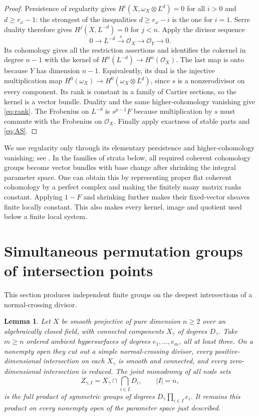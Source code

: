 \documentclass[11pt]{article}
\newtheorem{lemma}[theorem]{Lemma}
\theoremstyle{remark}\newtheorem{remark}[theorem]{Remark}
\newcommand{\OO}{\mathcal O}
\begin{document}
\begin{proof}
Persistence of regularity gives $H^i(X,\omega_X\otimes L^d)=0$ for all $i>0$ and $d\ge r_\omega-1$: the strongest of the inequalities $d\ge r_\omega-i$ is the one for $i=1$. Serre duality therefore gives $H^j(X,L^{-d})=0$ for $j<n$. Apply the divisor sequence
\[
             0\longrightarrow L^{-d}\xrightarrow{s}\OO_X
                    \longrightarrow\OO_Y\longrightarrow0.
\]
Its cohomology gives all the restriction assertions and identifies the cokernel in degree $n-1$ with the kernel of $H^n(L^{-d})\to H^n(\OO_X)$. The last map is onto because $Y$ has dimension $n-1$. Equivalently, its dual is the injective multiplication map
$H^0(\omega_X)\to H^0(\omega_X\otimes L^d)$, since $s$ is a nonzerodivisor on every component. Its rank is constant in a family of Cartier sections, so the kernel is a vector bundle. Duality and the same higher-cohomology vanishing give \eqref{eq:rank}. The Frobenius on $L^{-d}$ is $s^{p-1}F$ because multiplication by $s$ must commute with the Frobenius on $\OO_X$. Finally apply exactness of stable parts and \eqref{eq:AS}.
\end{proof}

We use regularity only through its elementary persistence and higher-cohomology vanishing; see \citet[\S33.35, Lemma~33.35.10]{StacksRegularity}. In the families of strata below, all required coherent cohomology groups become vector bundles with base change after shrinking the integral parameter space. One can obtain this by representing proper flat coherent cohomology by a perfect complex \citep[Lemma~30.22.1, full proof]{StacksBaseChange} and making the finitely many matrix ranks constant. Applying $1-F$ and shrinking further makes their fixed-vector sheaves finite locally constant. This also makes every kernel, image and quotient used below a finite local system.

\section{Simultaneous permutation groups of intersection points}\label{sec:nodes}

This section produces independent finite groups on the deepest intersections of a normal-crossing divisor.

\begin{lemma}\label{lem:nodes}
Let $X$ be smooth projective of pure dimension $n\ge2$ over an algebraically closed field, with connected components $X_\gamma$ of degrees $D_\gamma$. Take $m\ge n$ ordered ambient hypersurfaces of degrees $e_1,\ldots,e_m$, all at least three. On a nonempty open they cut out a simple normal-crossing divisor, every positive-dimensional intersection on each $X_\gamma$ is smooth and connected, and every zero-dimensional intersection is reduced. The joint monodromy of all node sets
\[
 Z_{\gamma,I}=X_\gamma\cap\bigcap_{i\in I}D_i,
                    \qquad |I|=n,
\]
is the full product of symmetric groups of degrees
$D_\gamma\prod_{i\in I}e_i$. It remains this product on every nonempty open of the parameter space just described.
\end{lemma}
\end{document}
